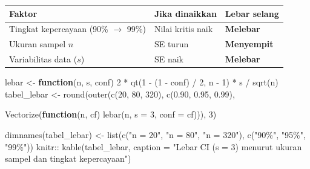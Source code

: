 \documentclass[
  indonesian,
  letterpaper,
]{book}
\newenvironment{Shaded}{\begin{snugshade}}{\end{snugshade}}
\newcommand{\AttributeTok}[1]{\textcolor[rgb]{0.40,0.45,0.13}{#1}}
\newcommand{\ControlFlowTok}[1]{\textcolor[rgb]{0.00,0.23,0.31}{\textbf{#1}}}
\newcommand{\DecValTok}[1]{\textcolor[rgb]{0.68,0.00,0.00}{#1}}
\newcommand{\FloatTok}[1]{\textcolor[rgb]{0.68,0.00,0.00}{#1}}
\newcommand{\FunctionTok}[1]{\textcolor[rgb]{0.28,0.35,0.67}{#1}}
\newcommand{\NormalTok}[1]{\textcolor[rgb]{0.00,0.23,0.31}{#1}}
\newcommand{\OtherTok}[1]{\textcolor[rgb]{0.00,0.23,0.31}{#1}}
\newcommand{\SpecialCharTok}[1]{\textcolor[rgb]{0.37,0.37,0.37}{#1}}
\newcommand{\StringTok}[1]{\textcolor[rgb]{0.13,0.47,0.30}{#1}}
\newcounter{none} %
\begin{document}
{\def\LTcaptype{none} %
\begin{longtable}[]{@{}
  >{\raggedright\arraybackslash}p{}
  >{\raggedright\arraybackslash}p{}
  >{\raggedright\arraybackslash}p{}@{}}
\toprule\noalign{}
\begin{minipage}[b]{\linewidth}\raggedright
Faktor
\end{minipage} & \begin{minipage}[b]{\linewidth}\raggedright
Jika dinaikkan
\end{minipage} & \begin{minipage}[b]{\linewidth}\raggedright
Lebar selang
\end{minipage} \\
\midrule\noalign{}
\endhead
\bottomrule\noalign{}
\endlastfoot
Tingkat kepercayaan (90\% \(\rightarrow\) 99\%) & Nilai kritis naik &
\textbf{Melebar} \\
Ukuran sampel \(n\) & SE turun & \textbf{Menyempit} \\
Variabilitas data (\(s\)) & SE naik & \textbf{Melebar} \\
\end{longtable}
}

\begin{Shaded}
\begin{Highlighting}[]
\NormalTok{lebar }\OtherTok{\textless{}{-}} \ControlFlowTok{function}\NormalTok{(n, s, conf) }\DecValTok{2} \SpecialCharTok{*} \FunctionTok{qt}\NormalTok{(}\DecValTok{1} \SpecialCharTok{{-}}\NormalTok{ (}\DecValTok{1} \SpecialCharTok{{-}}\NormalTok{ conf) }\SpecialCharTok{/} \DecValTok{2}\NormalTok{, n }\SpecialCharTok{{-}} \DecValTok{1}\NormalTok{) }\SpecialCharTok{*}\NormalTok{ s }\SpecialCharTok{/} \FunctionTok{sqrt}\NormalTok{(n)}
\NormalTok{tabel\_lebar }\OtherTok{\textless{}{-}} \FunctionTok{round}\NormalTok{(}\FunctionTok{outer}\NormalTok{(}\FunctionTok{c}\NormalTok{(}\DecValTok{20}\NormalTok{, }\DecValTok{80}\NormalTok{, }\DecValTok{320}\NormalTok{), }\FunctionTok{c}\NormalTok{(}\FloatTok{0.90}\NormalTok{, }\FloatTok{0.95}\NormalTok{, }\FloatTok{0.99}\NormalTok{),}

\FunctionTok{Vectorize}\NormalTok{(}\ControlFlowTok{function}\NormalTok{(n, cf) }\FunctionTok{lebar}\NormalTok{(n, }\AttributeTok{s =} \DecValTok{3}\NormalTok{, }\AttributeTok{conf =}\NormalTok{ cf))),}
\DecValTok{3}\NormalTok{)}

\FunctionTok{dimnames}\NormalTok{(tabel\_lebar) }\OtherTok{\textless{}{-}} \FunctionTok{list}\NormalTok{(}\FunctionTok{c}\NormalTok{(}\StringTok{"n = 20"}\NormalTok{, }\StringTok{"n = 80"}\NormalTok{, }\StringTok{"n = 320"}\NormalTok{), }\FunctionTok{c}\NormalTok{(}\StringTok{"90\%"}\NormalTok{, }\StringTok{"95\%"}\NormalTok{,}
\StringTok{"99\%"}\NormalTok{))}
\NormalTok{knitr}\SpecialCharTok{::} \FunctionTok{kable}\NormalTok{(tabel\_lebar, }\AttributeTok{caption =} \StringTok{"Lebar CI (s = 3) menurut ukuran sampel dan tingkat}
\StringTok{kepercayaan"}\NormalTok{)}
\end{Highlighting}
\end{Shaded}
\end{document}

